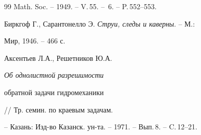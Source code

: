 \begin{thebibliography}{99}
Math. Soc. -- 1949. -- V.\,55. -- \No\,6. -- P.\,552--553. 




Биркгоф Г., Сарантонелло Э. {\it Струи, следы и каверны}. -- М.: 


Мир, 1946. -- 466 с. 




Аксентьев Л.А., Решетников Ю.А. {\it Об однолистной разрешимости 


обратной задачи гидромеханики} // Тр. семин. по краевым задачам. 


-- Казань: Изд-во Казанск. ун-та. -- 1971. -- Вып.\,8. -- C.\,12--21. 


 


\end{thebibliography} 


 


\vskip 2cm 


 






 


 


